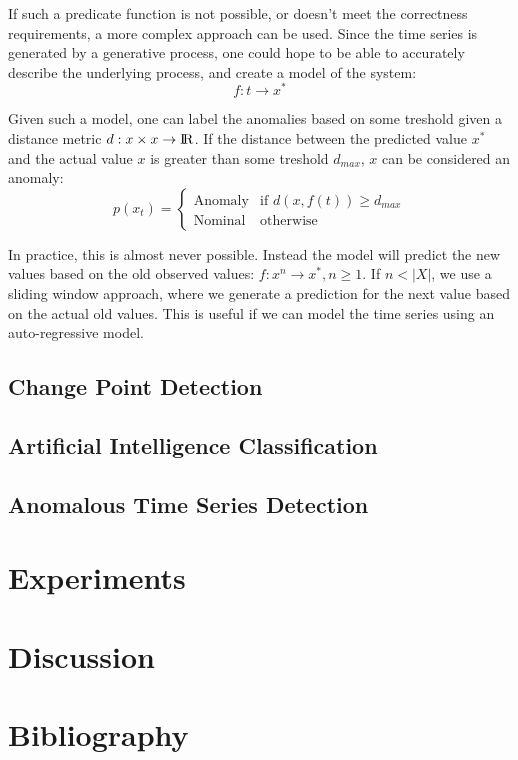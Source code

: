 \documentclass{article}
\begin{document}
If such a predicate function is not possible, or doesn't meet the correctness requirements, a more complex approach can be used. Since the time series is generated by a generative process, one could hope to be able to accurately describe the underlying process, and create a model of the system:
$$
    f: t \rightarrow x^*
$$

Given such a model, one can label the anomalies based on some treshold given a distance metric $d: x \times x \rightarrow {\rm I\!R}$. If the distance between the predicted value $x^*$ and the actual value $x$ is greater than some treshold $d_{max}$, $x$ can be considered an anomaly:
$$
    p(x_t) =
        \begin{cases}
            \text{Anomaly} & \text{if } d(x, f(t)) \ge d_{max} \\
            \text{Nominal} & \text{otherwise}
        \end{cases}
$$

In practice, this is almost never possible. Instead the model will predict the new values based on the old observed values: $f : x^n \rightarrow x^*, n \ge 1$. If $n < |X|$, we use a sliding window approach, where we generate a prediction for the next value based on the actual old values. This is useful if we can model the time series using an auto-regressive model.

\subsection{Change Point Detection}

\subsection{Artificial Intelligence Classification}

\subsection{Anomalous Time Series Detection}

\section{Experiments \label{experiments}}

\section{Discussion \label{discussion}}

\section*{Bibliography}

\printbibliography
\end{document}
